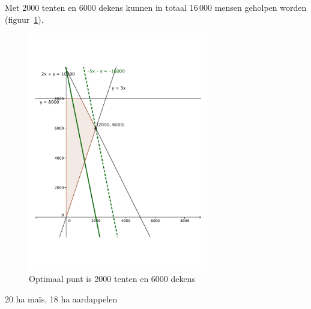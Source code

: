 \begin{Oplossing}{4.4}
     Met 2000 tenten en 6000 dekens kunnen in totaal 16\,000 mensen geholpen worden (figuur~\ref{fig:AZG}).
                   \begin{figure}[hbtp]
\centering
\includegraphics[width=0.7\textwidth]{oefeningen/FigurenLP/OefAZG.pdf}
\caption{Optimaal punt is 2000 tenten en 6000 dekens}
\label{fig:AZG}
\end{figure}
     
\end{Oplossing}
\begin{Oplossing}{4.6}
     20 ha ma\"is, 18 ha aardappelen
     
\end{Oplossing}
